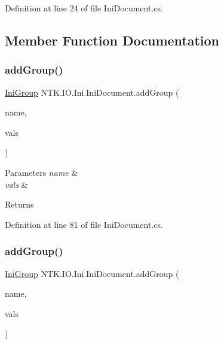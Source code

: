 Definition at line 24 of file Ini\+Document.\+cs.



\subsection{Member Function Documentation}
\mbox{\label{class_n_t_k_1_1_i_o_1_1_ini_1_1_ini_document_adce6bc6eba716042b10745645fd74ebf}} 
\subsubsection{\texorpdfstring{addGroup()}{addGroup()}\hspace{0.1cm}{\footnotesize\ttfamily [1/2]}}
{\footnotesize\ttfamily \mbox{\hyperlink{class_n_t_k_1_1_i_o_1_1_ini_1_1_ini_group}{Ini\+Group}} N\+T\+K.\+I\+O.\+Ini.\+Ini\+Document.\+add\+Group (\begin{DoxyParamCaption}\item[{String}]{name,  }\item[{params \mbox{\hyperlink{class_n_t_k_1_1_i_o_1_1_ini_1_1_ini_value}{Ini\+Value}} \mbox{[}$\,$\mbox{]}}]{vals }\end{DoxyParamCaption})}






\begin{DoxyParams}{Parameters}
{\em name} & \\
\hline
{\em vals} & \\
\hline
\end{DoxyParams}
\begin{DoxyReturn}{Returns}

\end{DoxyReturn}


Definition at line 81 of file Ini\+Document.\+cs.

\mbox{\label{class_n_t_k_1_1_i_o_1_1_ini_1_1_ini_document_a8f096a4a767cd5e7faf80ee8419c087d}} 
\subsubsection{\texorpdfstring{addGroup()}{addGroup()}\hspace{0.1cm}{\footnotesize\ttfamily [2/2]}}
{\footnotesize\ttfamily \mbox{\hyperlink{class_n_t_k_1_1_i_o_1_1_ini_1_1_ini_group}{Ini\+Group}} N\+T\+K.\+I\+O.\+Ini.\+Ini\+Document.\+add\+Group (\begin{DoxyParamCaption}\item[{String}]{name,  }\item[{List$<$ \mbox{\hyperlink{class_n_t_k_1_1_i_o_1_1_ini_1_1_ini_value}{Ini\+Value}} $>$}]{vals }\end{DoxyParamCaption})}






